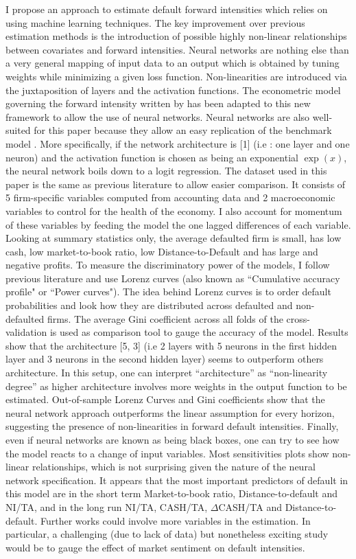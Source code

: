 I propose an approach to estimate default forward intensities which relies on using machine learning techniques. The key improvement over previous estimation methods is the introduction of possible highly non-linear relationships between covariates and forward intensities. Neural networks are nothing else than a very general mapping of input data to an output which is obtained by tuning weights while minimizing a given loss function. Non-linearities are introduced via the juxtaposition of layers and the activation functions. The econometric model governing the forward intensity written by \citet{Duan2012} has been adapted to this new framework to allow the use of neural networks. Neural networks are also well-suited for this paper because they allow an easy replication of the benchmark model \citet{Duan2012}. More specifically, if the network architecture is [1] (i.e : one layer and one neuron) and the activation function is chosen as being an exponential $\exp(x)$, the neural network boils down to a logit regression. The dataset used in this paper is the same as previous literature to allow easier comparison. It consists of 5 firm-specific variables computed from accounting data and 2 macroeconomic variables to control for the health of the economy. I also account for momentum of these variables by feeding the model the one lagged differences of each variable. Looking at summary statistics only, the average defaulted firm is small, has low cash, low market-to-book ratio, low Distance-to-Default and has large and negative profits. To measure the discriminatory power of the models, I follow previous literature and use Lorenz curves (also known as ``Cumulative accuracy profile" or ``Power curves"). The idea behind Lorenz curves is to order default probabilities and look how they are distributed across defaulted and non-defaulted firms. The average Gini coefficient across all folds of the cross-validation is used as comparison tool to gauge the accuracy of the model. Results show that the architecture [5, 3] (i.e 2 layers with 5 neurons in the first hidden layer and 3 neurons in the second hidden layer) seems to outperform others architecture. In this setup, one can interpret ``architecture'' as ``non-linearity degree'' as higher architecture involves more weights in the output function to be estimated. Out-of-sample Lorenz Curves and Gini coefficients show that the neural network approach outperforms the linear assumption for every horizon, suggesting the presence of non-linearities in forward default intensities. Finally, even if neural networks are known as being black boxes, one can try to see how the model reacts to a change of input variables. Most sensitivities plots show non-linear relationships, which is not surprising given the nature of the neural network specification. It appears that the most important predictors of default in this model are in the short term Market-to-book ratio, Distance-to-default and NI/TA, and in the long run NI/TA, CASH/TA, $\Delta$CASH/TA and Distance-to-default. Further works could involve more variables in the estimation. In particular, a challenging (due to lack of data) but nonetheless exciting study would be to gauge the effect of market sentiment on default intensities.



